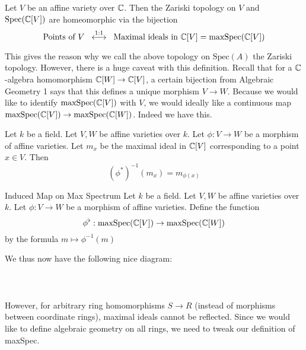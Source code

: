 \documentclass[a4paper]{article}
\begin{document}
\begin{prp}{}{} Let $V$ be an affine variety over $\mathbb{C}$. Then the Zariski topology on $V$ and $\text{Spec}(\mathbb{C}[V])$ are homeomorphic via the bijection $$\text{Points of }V\;\;\overset{1:1}{\longleftrightarrow}\;\;\text{Maximal ideals in }\mathbb{C}[V]=\text{maxSpec}(\mathbb{C}[V])$$
\end{prp}

This gives the reason why we call the above topology on $\text{Spec}(A)$ the Zariski topology. However, there is a huge caveat with this definition. Recall that for a $\mathbb{C}$-algebra homomorphism $\mathbb{C}[W]\to\mathbb{C}[V]$, a certain bijection from Algebraic Geometry 1 says that this defines a unique morphism $V\to W$. Because we would like to identify $\text{maxSpec}(\mathbb{C}[V])$ with $V$, we would ideally like a continuous map $\text{maxSpec}(\mathbb{C}[V])\to\text{maxSpec}(\mathbb{C}[W])$. Indeed we have this. 

\begin{lmm}{}{} Let $k$ be a field. Let $V,W$ be affine varieties over $k$. Let $\phi:V\to W$ be a morphism of affine varieties. Let $m_x$ be the maximal ideal in $\mathbb{C}[V]$ corresponding to a point $x\in V$. Then $$(\phi^\ast)^{-1}(m_x)=m_{\phi(x)}$$
\end{lmm}

\begin{defn}{Induced Map on Max Spectrum}{} Let $k$ be a field. Let $V,W$ be affine varieties over $k$. Let $\phi:V\to W$ be a morphism of affine varieties. Define the function $$\phi^\flat:\text{maxSpec}(\mathbb{C}[V])\to\text{maxSpec}(\mathbb{C}[W])$$ by the formula $m\mapsto\phi^{-1}(m)$
\end{defn}

We thus now have the following nice diagram: \\~\\
\\~\\

However, for arbitrary ring homomorphisms $S\to R$ (instead of morphisms between coordinate rings), maximal ideals cannot be reflected. Since we would like to define algebraic geometry on all rings, we need to tweak our definition of maxSpec. 
\end{document}
